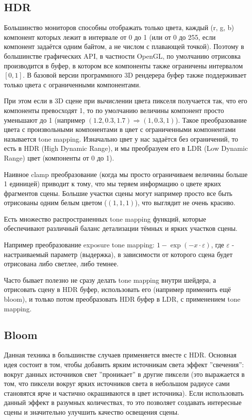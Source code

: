 \documentclass[14pt]{extarticle}
\begin{document}
\subsection{HDR}
Большинство мониторов способны отображать только цвета, каждый (r, g, b) компонент которых лежит в интервале от 0 до 1 (или от 0 до 255, если компонент задаётся одним байтом, а не числом с плавающей точкой). Поэтому в большинстве графических API, в частности OpenGL, по умолчанию отрисовка производится в буфер, в котором все компоненты также ограничены интервалом $[0, 1]$. В базовой версии программного 3D рендерера буфер также поддерживает только цвета с ограниченными компонентами. 

При этом если в 3D сцене при вычислении цвета пикселя получается так, что его компоненты превосходят 1, то по умолчанию величины компонент просто уменьшают до 1 (например $(1.2, 0.3, 1.7) \Rightarrow (1, 0.3, 1)$). Такое преобразование цвета с произвольными компонентами в цвет с ограниченными компонентами называется tone mapping. Изначально цвет у нас задаётся без ограничений, то есть в HDR (High Dynamic Range), и мы преобразуем его в LDR (Low Dynamic Range) цвет (компоненты от 0 до 1).

Наивное clamp преобразование (когда мы просто ограничиваем величины больше 1 единицей) приводит к тому, что мы теряем информацию о цвете ярких фрагментов сцены. Большие участки сцены могут например просто все быть отрисованы одним белым цветом ($(1, 1, 1)$), что выглядит не очень красиво.

Есть множество распространенных tone mapping функций, которые обеспечивают различный баланс детализации тёмных и ярких участков сцены.

Например преобразование exposure tone mapping: $1 - \exp(-x \cdot \varepsilon)$, где $\varepsilon$ - настраиваемый параметр (выдержка), в зависимости от которого сцена будет отрисована либо светлее, либо темнее.

Часто бывает полезно не сразу делать tone mapping внутри шейдера, а отрисовать сцену в HDR буфер, использовать его (например применить ещё bloom), и только потом преобразовать HDR буфер в LDR, с применением tone mapping.

\subsection{Bloom}
Данная техника в большинстве случаев применяется вместе с HDR. Основная идея состоит в том, чтобы добавить ярким источникам света эффект ''свечения'': вокруг данных источников свет ''проникает'' в другие пиксели (это выражается в том, что пиксели вокруг ярких источников света в небольшом радиусе сами становятся ярче и частично окрашиваются в цвет источника). Если использовать данный эффект в разумных количествах, то это позволяет создавать интересные сцены и значительно улучшить качество освещения сцены.
\end{document}
